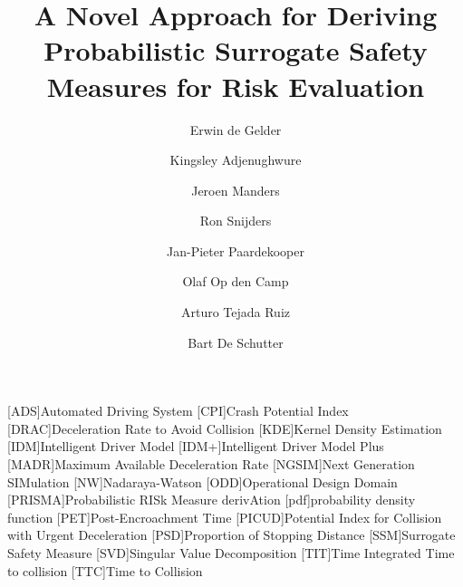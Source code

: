 \documentclass[3p,onecolumn,authoryear]{elsarticle}
\title{\cstarta A Novel \cenda Approach for Deriving Probabilistic Surrogate Safety Measures for Risk Evaluation}
\author[1,2]{Erwin de Gelder\corref{cor1}}
\author[3]{Kingsley Adjenughwure}
\author[1]{Jeroen Manders}
\author[4]{Ron Snijders}
\author[1,5]{Jan-Pieter Paardekooper}
\author[1]{Olaf Op den Camp}
\author[1,6]{Arturo Tejada Ruiz}
\author[1,2]{Bart De Schutter}
\date{}
\begin{document}
\begin{acronym}[AAAAAAAA]
	[ADS]{Automated Driving System}
	[CPI]{Crash Potential Index}
	[DRAC]{Deceleration Rate to Avoid Collision}
	[KDE]{Kernel Density Estimation}
	[IDM]{Intelligent Driver Model}
	[IDM+]{Intelligent Driver Model Plus}
	[MADR]{Maximum Available Deceleration Rate}
	[NGSIM]{Next Generation SIMulation}
	[NW]{Nadaraya-Watson}
	[ODD]{Operational Design Domain}
	[PRISMA]{Probabilistic RISk Measure derivAtion}
	[pdf]{probability density function}
	[PET]{Post-Encroachment Time}
	[PICUD]{Potential Index for Collision with Urgent Deceleration}
	[PSD]{Proportion of Stopping Distance}
	[SSM]{Surrogate Safety Measure}
	[SVD]{Singular Value Decomposition}
	[TIT]{Time Integrated Time to collision}
	[TTC]{Time to Collision}
\end{acronym}



\maketitle
\acresetall




\acresetall







\end{document}
